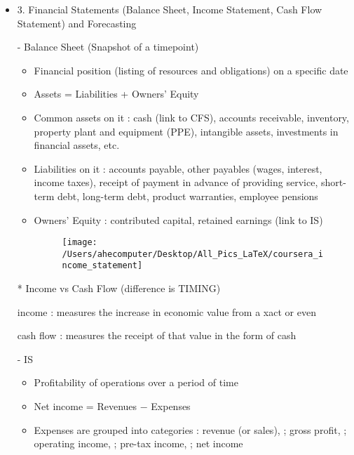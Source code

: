 \documentclass{article}
\begin{document}
\begin{itemize}
\item 3. Financial Statements (Balance Sheet, Income Statement, Cash Flow Statement) and Forecasting

- Balance Sheet (Snapshot of a timepoint)
\begin{itemize}
	\item Financial position (listing of resources and obligations) on a specific date
	\item Assets = Liabilities + Owners' Equity
	\item Common assets on it : cash (link to CFS), accounts receivable, inventory, property plant and equipment (PPE), intangible assets, investments in financial assets, etc.
	\item Liabilities on it : accounts payable, other payables (wages, interest, income taxes), receipt of payment in advance of providing service, short-term debt, long-term debt, product warranties, employee pensions
	\item Owners' Equity : contributed capital, retained earnings (link to IS)
	\begin{figure}[h!]
	  \texttt{[image: /Users/ahecomputer/Desktop/All\_Pics\_LaTeX/coursera\_income\_statement]}
	\end{figure}
\end{itemize}

* Income vs Cash Flow (difference is TIMING)

income : measures the increase in economic value from a xact or even

cash flow : measures the receipt of that value in the form of cash

- IS
\begin{itemize}
	\item Profitability of operations over a period of time
	\item Net income = Revenues $-$ Expenses
	\item Expenses are grouped into categories : revenue (or sales), ; gross profit, ; operating income, ; pre-tax income, ; net income
\end{itemize}


\end{itemize}
\end{document}

